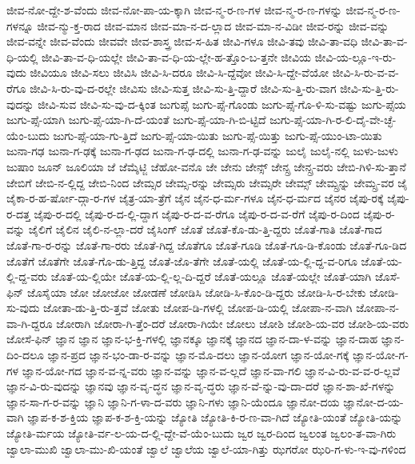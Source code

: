{ಜೀವ-ನೋ-ದ್ದೇ-ಶ-ವೆಂದು
ಜೀವ-ನೋ-ಪಾ-ಯ-ಕ್ಕಾಗಿ
ಜೀವ-ನ್ಮ-ರ-ಣ-ಗಳ
ಜೀವ-ನ್ಮ-ರ-ಣ-ಗಳನ್ನು
ಜೀವ-ನ್ಮ-ರ-ಣ-ಗಳನ್ನೂ
ಜೀವ-ನ್ಮು-ಕ್ತ-ರಾದ
ಜೀವ-ಮಾನ
ಜೀವ-ಮಾ-ನ-ದ-ಲ್ಲಾದ
ಜೀವ-ಮಾ-ನ-ವಿಡೀ
ಜೀವ-ರನ್ನು
ಜೀವ-ವನ್ನು
ಜೀವ-ವನ್ನೇ
ಜೀವ-ವೆಂದು
ಜೀವವೇ
ಜೀವ-ಶಾಸ್ತ್ರ
ಜೀವ-ಸ-ಹಿತ
ಜೀವಿ-ಗಳೂ
ಜೀವಿ-ತವು
ಜೀವಿ-ತಾ-ವಧಿ
ಜೀವಿ-ತಾ-ವ-ಧಿ-ಯಲ್ಲಿ
ಜೀವಿ-ತಾ-ವ-ಧಿ-ಯಲ್ಲೇ
ಜೀವಿ-ತಾ-ವ-ಧಿ-ಯ-ಲ್ಲೇ-ಹ-ತ್ತೊಂ-ಬ-ತ್ತನೇ
ಜೀವಿಯ
ಜೀವಿ-ಯ-ಲ್ಲೂ-ಇ-ರು-ವುದು
ಜೀವಿಯೂ
ಜೀವಿ-ಸಲು
ಜೀವಿಸಿ
ಜೀವಿ-ಸಿ-ದರೂ
ಜೀವಿ-ಸಿ-ದ್ದೆವೋ
ಜೀವಿ-ಸಿ-ದ್ದೇ-ವೆಯೋ
ಜೀವಿ-ಸಿ-ರು-ವ-ವ-ರೆಗೂ
ಜೀವಿ-ಸಿ-ರು-ವು-ದ-ರಲ್ಲೇ
ಜೀವಿಸು
ಜೀವಿ-ಸುತ್ತ
ಜೀವಿ-ಸು-ತ್ತಿ-ದ್ದಾರೆ
ಜೀವಿ-ಸು-ತ್ತಿ-ರು-ವಾಗ
ಜೀವಿ-ಸು-ತ್ತಿ-ರು-ವುದನ್ನು
ಜೀವಿ-ಸುವ
ಜೀವಿ-ಸು-ವು-ದ-ಕ್ಕಿಂತ
ಜುಗುಪ್ಸೆ
ಜುಗು-ಪ್ಸೆ-ಗೊಂಡು
ಜುಗು-ಪ್ಸೆ-ಗೊ-ಳಿ-ಸು-ವಷ್ಟು
ಜುಗು-ಪ್ಸೆಯ
ಜುಗು-ಪ್ಸೆ-ಯಾಗಿ
ಜುಗು-ಪ್ಸೆ-ಯಾ-ಗಿ-ದೆ-ಯಂತೆ
ಜುಗು-ಪ್ಸೆ-ಯಾ-ಗಿ-ಬಿ-ಟ್ಟಿದೆ
ಜುಗು-ಪ್ಸೆ-ಯಾ-ಗಿ-ರ-ಲಿ-ದೈ-ವೇ-ಚ್ಛೆ-ಯೆಂ-ಬುದು
ಜುಗು-ಪ್ಸೆ-ಯಾ-ಗು-ತ್ತಿದೆ
ಜುಗು-ಪ್ಸೆ-ಯಾ-ಯಿತು
ಜುಗು-ಪ್ಸೆ-ಯಿತ್ತು
ಜುಗು-ಪ್ಸೆ-ಯುಂ-ಟಾ-ಯಿತು
ಜುನಾ-ಗಢ
ಜುನಾ-ಗ-ಢಕ್ಕೆ
ಜುನಾ-ಗ-ಢದ
ಜುನಾ-ಗ-ಢ-ದಲ್ಲಿ
ಜುನಾ-ಗ-ಢ-ವನ್ನು
ಜುಲೈ
ಜುಲೈ-ನಲ್ಲಿ
ಜುಳು-ಜುಳು
ಜುಷಾಂ
ಜೂನ್
ಜೂಲಿಯಾ
ಜೆ
ಜೆಮ್ಶೆಟ್ಜಿ
ಜೆಹೋ-ವನೊ
ಜೇ
ಜೇನು
ಜೇನ್ಸ್
ಜೇನ್ಸ್ರ
ಜೇನ್ಸ್ರ-ವರು
ಜೇಬಿ-ಗಿಳಿ-ಸು-ತ್ತಾನೆ
ಜೇಬಿಗೆ
ಜೇಬಿ-ನ-ಲ್ಲಿದ್ದ
ಜೇಬಿ-ನಿಂದ
ಜೇಮ್ಸರ
ಜೇಮ್ಸ-ರನ್ನು
ಜೇಮ್ಸರು
ಜೇಮ್ಸರೇ
ಜೇಮ್ಸ್
ಜೇಮ್ಸ್ರನ್ನು
ಜೇಮ್ಸ್ರ-ವರ
ಜೈ
ಜೈಕಾ-ರ-ಹ-ರ್ಷೋ-ದ್ಗಾ-ರ-ಗಳ
ಜೈತ್ರ-ಯಾ-ತ್ರೆಗೆ
ಜೈನ
ಜೈನ-ಧ-ರ್ಮ-ಗಳೂ
ಜೈನ-ಧ-ರ್ಮದ
ಜೈನರ
ಜೈಪು-ರಕ್ಕೆ
ಜೈಪು-ರ-ದತ್ತ
ಜೈಪು-ರ-ದಲ್ಲಿ
ಜೈಪು-ರ-ದ-ಲ್ಲಿ-ದ್ದಾಗ
ಜೈಪು-ರ-ದ-ವ-ರೆಗೂ
ಜೈಪು-ರ-ದ-ವ-ರೆಗೆ
ಜೈಪು-ರ-ದಿಂದ
ಜೈಪು-ರ-ವನ್ನು
ಜೈಲಿಗೆ
ಜೈಲಿನ
ಜೈಲಿ-ನ-ಲ್ಲಾ-ದರೆ
ಜೈಸಿಂಗ್
ಜೊತೆ
ಜೊತೆ-ಕೊ-ಡು-ತ್ತಿ-ದ್ದರು
ಜೊತೆ-ಗಾತಿ
ಜೊತೆ-ಗಾದ
ಜೊತೆ-ಗಾ-ರ-ರನ್ನು
ಜೊತೆ-ಗಾ-ರರು
ಜೊತೆ-ಗಿದ್ದ
ಜೊತೆಗೂ
ಜೊತೆ-ಗೂಡಿ
ಜೊತೆ-ಗೂ-ಡಿ-ಕೊಂಡು
ಜೊತೆ-ಗೂ-ಡಿದ
ಜೊತೆಗೆ
ಜೊತೆಗೇ
ಜೊತೆ-ಗೊ-ಡು-ತ್ತಿದ್ದ
ಜೊತೆ-ಜೊ-ತೆಗೇ
ಜೊತೆ-ಯಲ್ಲಿ
ಜೊತೆ-ಯ-ಲ್ಲಿ-ದ್ದ-ವ-ರಿಗೂ
ಜೊತೆ-ಯ-ಲ್ಲಿ-ದ್ದ-ವರು
ಜೊತೆ-ಯ-ಲ್ಲಿಯೇ
ಜೊತೆ-ಯ-ಲ್ಲಿ-ಲ್ಲ-ದಿ-ದ್ದರೆ
ಜೊತೆ-ಯಲ್ಲೂ
ಜೊತೆ-ಯಲ್ಲೇ
ಜೊತೆ-ಯಾಗಿ
ಜೊಸೆ-ಫಿನ್
ಜೊಸೈಯಾ
ಜೋ
ಜೋಜೋ
ಜೋಡಣೆ
ಜೋಡಿಸಿ
ಜೋಡಿ-ಸಿ-ಕೊಂ-ಡಿ-ದ್ದರು
ಜೋಡಿ-ಸಿ-ರ-ಬೇಕು
ಜೋಡಿ-ಸು-ವುದು
ಜೋತಾ-ಡು-ತ್ತಿ-ರು-ತ್ತವೆ
ಜೋತು
ಜೋಪ-ಡಿ-ಗಳಲ್ಲಿ
ಜೋಪ-ಡಿ-ಯಲ್ಲಿ
ಜೋಪಾ-ನ-ವಾಗಿ
ಜೋಪಾ-ನ-ವಾ-ಗಿ-ದ್ದರೂ
ಜೋರಾಗಿ
ಜೋರಾ-ಗಿ-ತ್ತೆಂ-ದರೆ
ಜೋರಾ-ಗಿಯೇ
ಜೋಲು
ಜೋಶಿ
ಜೋಶಿ-ಯ-ವರ
ಜೋಶಿ-ಯ-ವರು
ಜೋಸೆ-ಫಿನ್
ಜ್ಞಾನ
ಜ್ಞಾನ
ಜ್ಞಾನ-ಭ-ಕ್ತಿ-ಗಳಲ್ಲಿ
ಜ್ಞಾನಕ್ಕೂ
ಜ್ಞಾನಕ್ಕೆ
ಜ್ಞಾನದ
ಜ್ಞಾನ-ದಾ-ಳ-ವನ್ನು
ಜ್ಞಾನ-ದಾಹ
ಜ್ಞಾನ-ದಿಂ-ದಲೂ
ಜ್ಞಾನ-ಪ್ರದ
ಜ್ಞಾನ-ಭಂ-ಡಾ-ರ-ವನ್ನು
ಜ್ಞಾನ-ಮೊ-ದಲು
ಜ್ಞಾನ-ಯೋಗ
ಜ್ಞಾನ-ಯೋ-ಗಕ್ಕೆ
ಜ್ಞಾನ-ಯೋ-ಗ-ಗಳ
ಜ್ಞಾನ-ಯೋ-ಗದ
ಜ್ಞಾನ-ವ-ನ್ನ-ವರು
ಜ್ಞಾನ-ವನ್ನು
ಜ್ಞಾನ-ವ-ಲ್ಲದೆ
ಜ್ಞಾನ-ವಾ-ಗಲಿ
ಜ್ಞಾನ-ವಿ-ರು-ವ-ವ-ರ-ಲ್ಲವೆ
ಜ್ಞಾನ-ವಿ-ರು-ವುದನ್ನು
ಜ್ಞಾನವು
ಜ್ಞಾನ-ವೃ-ದ್ಧನ
ಜ್ಞಾನ-ವೃ-ದ್ಧರು
ಜ್ಞಾನ-ವೆ-ನ್ನು-ವು-ದಾ-ದರೆ
ಜ್ಞಾನ-ಶಾ-ಖೆ-ಗಳನ್ನು
ಜ್ಞಾನ-ಸಾ-ಗ-ರ-ವನ್ನು
ಜ್ಞಾನಿ
ಜ್ಞಾನಿ-ಗ-ಳಾ-ದ-ವರು
ಜ್ಞಾನಿ-ಗಳು
ಜ್ಞಾನಿ-ಯೆಂದೂ
ಜ್ಞಾನೋ-ದಯ
ಜ್ಞಾನೋ-ದ-ಯ-ವಾಗಿ
ಜ್ಞಾಪ-ಕ-ಶ-ಕ್ತಿಯ
ಜ್ಞಾಪ-ಕ-ಶ-ಕ್ತಿ-ಯನ್ನು
ಜ್ಯೋತಿ
ಜ್ಯೋತಿ-ಕಿ-ರ-ಣ-ವಾ-ಗಿದೆ
ಜ್ಯೋತಿ-ಯಂತೆ
ಜ್ಯೋತಿ-ಯನ್ನು
ಜ್ಯೋತಿ-ರ್ಮಯ
ಜ್ಯೋತಿ-ರ್ವ-ಲ-ಯ-ದ-ಲ್ಲಿ-ದ್ದೇ-ವೆ-ಯೆಂ-ಬುದು
ಜ್ವರ
ಜ್ವರ-ದಿಂದ
ಜ್ವಲಂತ
ಜ್ವಲಂ-ತ-ವಾ-ಗಿರು
ಜ್ವಾಲಾ-ಮುಖಿ
ಜ್ವಾಲಾ-ಮು-ಖಿ-ಯಂತೆ
ಜ್ವಾಲೆ
ಜ್ವಾಲೆಯ
ಜ್ವಾಲೆ-ಯಾ-ಗಿತ್ತು
ಝಗರೋ
ಝರಿ-ಗ-ಳು-ಇ-ವು-ಗಳಿಂದ
}
